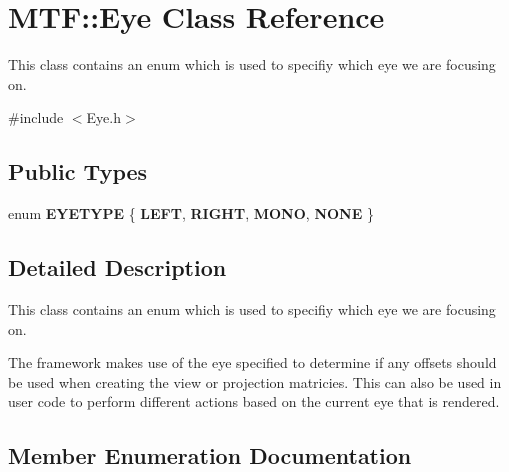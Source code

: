 \section{\-M\-T\-F\-:\-:\-Eye \-Class \-Reference}
\label{class_m_t_f_1_1_eye}


\-This class contains an enum which is used to specifiy which eye we are focusing on.  




{\ttfamily \#include $<$\-Eye.\-h$>$}

\subsection*{\-Public \-Types}
\begin{DoxyCompactItemize}
\item 
enum {\bf \-E\-Y\-E\-T\-Y\-P\-E} \{ {\bf \-L\-E\-F\-T}, 
{\bf \-R\-I\-G\-H\-T}, 
{\bf \-M\-O\-N\-O}, 
{\bf \-N\-O\-N\-E}
 \}
\end{DoxyCompactItemize}


\subsection{\-Detailed \-Description}
\-This class contains an enum which is used to specifiy which eye we are focusing on. 

\-The framework makes use of the eye specified to determine if any offsets should be used when creating the view or projection matricies. \-This can also be used in user code to perform different actions based on the current eye that is rendered. 

\subsection{\-Member \-Enumeration \-Documentation}
